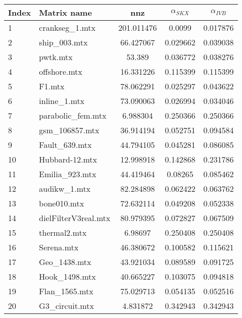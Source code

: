 \begin{tabular}{|l|l|S[round-mode=places,round-precision=2]|S[round-mode=places,round-precision=4]|S[round-mode=places,round-precision=4]|}
\toprule
{Index} & {Matrix name} &  {nnz} & {$\alpha_{SKX}$} & {$\alpha_{IVB}$}  \\
\midrule
{1}& {	crankseg\_1.mtx                }	& 201.011476	& 0.0099	& 0.017876	\\
{2}& {	ship\_003.mtx                  }	& 66.427067	& 0.029662	& 0.039038	\\
{3}& {	pwtk.mtx                      }	& 53.389	& 0.036772	& 0.038276	\\
{4}& {	offshore.mtx                  }	& 16.331226	& 0.115399	& 0.115399	\\
{5}& {	F1.mtx                        }	& 78.062291	& 0.025297	& 0.043622	\\
{6}& {	inline\_1.mtx                  }	& 73.090063	& 0.026994	& 0.034046	\\
{7}& {	parabolic\_fem.mtx             }	& 6.988304	& 0.250366	& 0.250366	\\
{8}& {	gsm\_106857.mtx                }	& 36.914194	& 0.052751	& 0.094584	\\
{9}& {	Fault\_639.mtx                 }	& 44.794105	& 0.045281	& 0.086085	\\
{10}& {	Hubbard-12.mtx                }	& 12.998918	& 0.142868	& 0.231786	\\
{11}& {	Emilia\_923.mtx                }	& 44.419464	& 0.08265	& 0.085462	\\
{12}& {	audikw\_1.mtx                  }	& 82.284898	& 0.062422	& 0.063762	\\
{13}& {	bone010.mtx                   }	& 72.632114	& 0.049208	& 0.052338	\\
{14}& {	dielFilterV3real.mtx          }	& 80.979395	& 0.072827	& 0.067509	\\
{15}& {	thermal2.mtx                  }	& 6.98697	& 0.250408	& 0.250408	\\
{16}& {	Serena.mtx                    }	& 46.380672	& 0.100582	& 0.115621	\\
{17}& {	Geo\_1438.mtx                  }	& 43.921034	& 0.089589	& 0.091725	\\
{18}& {	Hook\_1498.mtx                 }	& 40.665227	& 0.103075	& 0.094818	\\
{19}& {	Flan\_1565.mtx                 }	& 75.029713	& 0.054135	& 0.052516	\\
{20}& {	G3\_circuit.mtx                }	& 4.831872	& 0.342943	& 0.342943	\\

\end{tabular}
